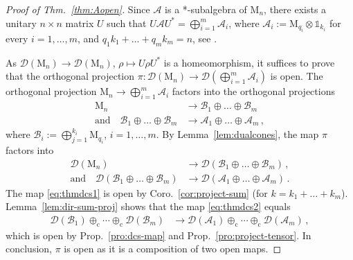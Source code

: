 \documentclass[a4paper,11pt,reqno]{amsart}
\newcommand{\M}{\mathrm{M}}
\newcommand{\cA}{\mathcal{A}}
\newcommand{\cB}{\mathcal{B}}
\newcommand{\cD}{\mathcal{D}}
\newcommand{\id}{\mathds{1}}
\newcommand{\dcs}{\oplus_\mathrm{c}}
\theoremstyle{definition}
\theoremstyle{remark}
\numberwithin{equation}{section}
\begin{document}
%
\begin{proof}[Proof of Thm.~\ref{thm:Aopen}]
Since $\cA$ is a *-subalgebra of $\M_n$, there exists a unitary $n\times n$ matrix 
$U$ such that $U\cA U^\ast=\bigoplus_{i=1}^m\cA_i$, where 
$\cA_i:=\M_{q_i}\otimes\id_{k_i}$ for every $i=1,\dots,m$, and 
$q_1k_1+\dots+q_mk_m=n$, see \cite[Thm.~5.6]{Farenick2001}.
\par
%
As $\cD(\M_n)\to\cD(\M_n)$, $\rho\mapsto U\rho U^\ast$ is a homeomorphism, it 
suffices to prove that the orthogonal projection 
$\pi:\cD(\M_n)\to\cD(\bigoplus_{i=1}^m\cA_i)$ is open. The orthogonal projection 
$\M_n\to\bigoplus_{i=1}^m\cA_i$ factors into the orthogonal projections
\begin{align*}
\M_n & \textstyle
\to\cB_1\oplus\dots\oplus\cB_m\\
\text{and}\quad
\cB_1\oplus\dots\oplus\cB_m & \textstyle
\to\cA_1\oplus\dots\oplus\cA_m\,,
\end{align*}
where $\cB_i:=\bigoplus_{j=1}^{k_i}\M_{q_i}$, $i=1,\dots,m$. By 
Lemma~\ref{lem:dualcones}, the map $\pi$ factors into
\begin{align}
\label{eq:thmdcs1}
\cD(\M_n)
&\to\cD(\cB_1\oplus\dots\oplus\cB_m)\,,\\
\label{eq:thmdcs2}
\text{and}\quad
\cD(\cB_1\oplus\dots\oplus\cB_m)
&\to\cD(\cA_1\oplus\dots\oplus\cA_m)\,.
\end{align}
The map \eqref{eq:thmdcs1} is open by Coro.~\ref{cor:project-sum} 
(for $k=k_1+\dots+k_m$). Lemma~\ref{lem:dir-sum-proj} shows that the map
\eqref{eq:thmdcs2} equals
\begin{align*}
\cD(\cB_1)\dcs\cdots\dcs\cD(\cB_m)
&\to\cD(\cA_1)\dcs\cdots\dcs\cD(\cA_m)\,,
\end{align*}
which is open by Prop.~\ref{pro:dcs-map} and Prop.~\ref{pro:project-tensor}. 
In conclusion, $\pi$ is open as it is a composition of two open maps.
\end{proof}
%
%
%
\end{document}
